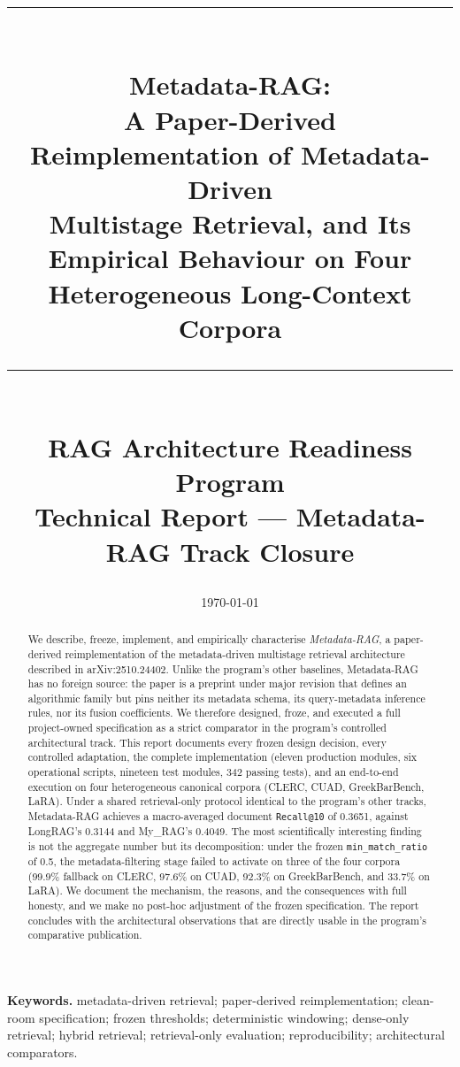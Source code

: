 \documentclass[11pt,a4paper]{article}
\title{
  \vspace{-1.5cm}
  \rule{\linewidth}{0.4pt}\\[0.3cm]
  {\Large\bfseries Metadata-RAG:}\\[0.15cm]
  {\large A Paper-Derived Reimplementation of Metadata-Driven\\
   Multistage Retrieval, and Its Empirical Behaviour on Four\\
   Heterogeneous Long-Context Corpora}\\[0.2cm]
  \rule{\linewidth}{0.4pt}\\[0.4cm]
  \normalsize RAG Architecture Readiness Program\\
  \small Technical Report --- Metadata-RAG Track Closure
}
\author{}
\date{\today}
\begin{document}
\maketitle
\thispagestyle{empty}

\begin{abstract}
\noindent
We describe, freeze, implement, and empirically characterise
\emph{Metadata-RAG}, a paper-derived reimplementation of the
metadata-driven multistage retrieval architecture described in
arXiv:2510.24402. Unlike the program's other baselines, Metadata-RAG
has no foreign source: the paper is a preprint under major revision
that defines an algorithmic family but pins neither its metadata
schema, its query-metadata inference rules, nor its fusion
coefficients. We therefore designed, froze, and executed a full
project-owned specification as a strict comparator in the program's
controlled architectural track. This report documents every frozen
design decision, every controlled adaptation, the complete
implementation (eleven production modules, six operational scripts,
nineteen test modules, \num{342} passing tests), and an end-to-end
execution on four heterogeneous canonical corpora (CLERC, CUAD,
GreekBarBench, LaRA). Under a shared retrieval-only protocol
identical to the program's other tracks, Metadata-RAG achieves a
macro-averaged document \texttt{Recall@10} of \num{0.3651}, against
LongRAG's \num{0.3144} and My\_RAG's \num{0.4049}. The most
scientifically interesting finding is not the aggregate number but
its decomposition: under the frozen \texttt{min\_match\_ratio} of
\num{0.5}, the metadata-filtering stage failed to activate on three
of the four corpora (\num{99.9}\% fallback on CLERC, \num{97.6}\% on
CUAD, \num{92.3}\% on GreekBarBench, and \num{33.7}\% on LaRA). We
document the mechanism, the reasons, and the consequences with full
honesty, and we make no post-hoc adjustment of the frozen
specification. The report concludes with the architectural
observations that are directly usable in the program's comparative
publication.
\end{abstract}

\vfill
\noindent\textbf{Keywords.} metadata-driven retrieval; paper-derived
reimplementation; clean-room specification; frozen thresholds;
deterministic windowing; dense-only retrieval; hybrid retrieval;
retrieval-only evaluation; reproducibility; architectural
comparators.

\newpage
\tableofcontents
\newpage
\end{document}
